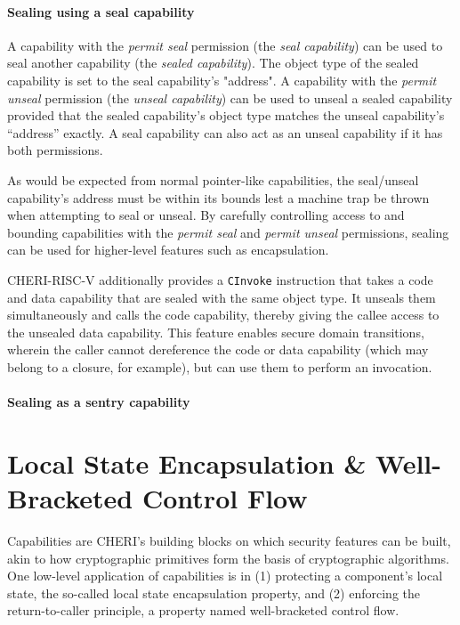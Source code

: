 \documentclass[main.tex]{subfiles}
\begin{document}
\paragraph{Sealing using a seal capability} A capability with the \emph{permit seal} permission (the \emph{seal capability}) can be used to seal another capability (the \emph{sealed capability}). The object type of the sealed capability is set to the seal capability's "address". A capability with the \emph{permit unseal} permission (the \emph{unseal capability}) can be used to unseal a sealed capability provided that the sealed capability's object type matches the unseal capability's “address” exactly. A seal capability can also act as an unseal capability if it has both permissions.

As would be expected from normal pointer-like capabilities, the seal/unseal capability's address must be within its bounds lest a machine trap be thrown when attempting to seal or unseal. By carefully controlling access to and bounding capabilities with the \emph{permit seal} and \emph{permit unseal} permissions, sealing can be used for higher-level features such as encapsulation.

CHERI-RISC-V additionally provides a \texttt{CInvoke} instruction that takes a code and data capability that are sealed with the same object type. It unseals them simultaneously and calls the code capability, thereby giving the callee access to the unsealed data capability. This feature enables secure domain transitions, wherein the caller cannot dereference the code or data capability (which may belong to a closure, for example), but can use them to perform an invocation.

\paragraph{Sealing as a sentry capability} %

\section{Local State Encapsulation \& Well-Bracketed Control Flow}
Capabilities are CHERI’s building blocks on which security features can be built, akin to how cryptographic primitives form the basis of cryptographic algorithms. One low-level application of capabilities is in (1) protecting a component's local state, the so-called local state encapsulation property, and (2) enforcing the return-to-caller principle, a property named well-bracketed control flow.
\end{document}
